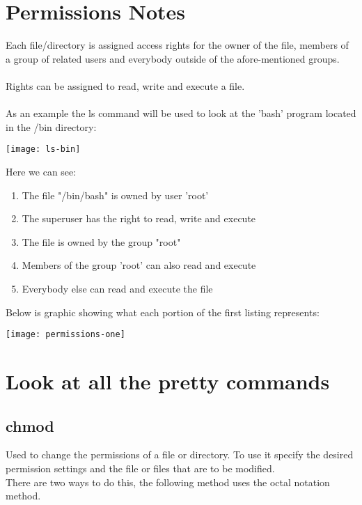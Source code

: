 \documentclass[12pt, letterpaper]{report}
\begin{document}
\section{Permissions Notes}
Each file/directory is assigned access rights for the owner of the file, members
of a group of related users and everybody outside of the afore-mentioned groups.\\\\
Rights can be assigned to read, write and execute a file.\\\\

As an example the ls command will be used to look at the 'bash' program located in
the /bin directory:\\
\begin{center}
\texttt{[image: ls-bin]}
\end{center}

Here we can see:
\begin{enumerate}
	\item The file "/bin/bash" is owned by user 'root'
	\item  The superuser has the right to read, write and execute
	\item The file is owned by the group "root"
	\item Members of the group 'root' can also read and execute
	\item Everybody else can read and execute the file
\end{enumerate}
Below is graphic showing what each portion of the first listing represents:\\
\begin{center}
\texttt{[image: permissions-one]}
\end{center}

\section{Look at all the pretty commands}
\subsection{chmod}
Used to change the permissions of a file or directory. To use it specify the 
desired permission settings and the file or files that are to be modified.\\
There are two ways to do this, the following method uses the octal notation
method.\\\\
\end{document}
